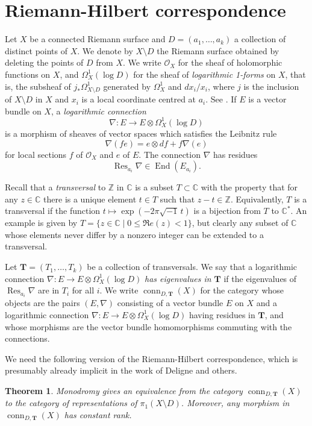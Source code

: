 \documentclass{amsart}
\theoremstyle{plain}
\newtheorem{thm}{Theorem}[section]
\theoremstyle{definition}
\theoremstyle{remark}
\newcommand{\C}{\mathbb{C}}
\newcommand{\Z}{\mathbb{Z}}
\DeclareMathOperator{\End}{End}
\DeclareMathOperator{\Res}{Res}
\DeclareMathOperator{\conn}{conn}
\newcommand{\OO}{\mathcal{O}}
\begin{document}
\section{Riemann-Hilbert correspondence}\label{s:RH}
Let $X$ be a connected Riemann surface and $D=(a_1,\dots,a_k)$ a collection
of distinct points of $X$. We denote by $X\setminus D$ the Riemann surface
obtained by deleting the points of $D$ from $X$.
We write $\OO_X$ for the sheaf of holomorphic functions on $X$, and $\Omega^1_X(\log D)$
for the sheaf of \emph{logarithmic 1-forms} on $X$, that is,
the subsheaf of $j_*\Omega_{X\setminus D}^1$ generated by $\Omega_X^1$ and $dx_i/x_i$,
where $j$ is the inclusion of $X\setminus D$ in $X$ and
$x_i$ is a local coordinate centred at $a_i$.
See \cite[\S II.3]{Deligne}.
If $E$ is a vector bundle on $X$,
a \emph{logarithmic connection}
\[
\nabla:E\to E\otimes \Omega^1_X(\log D)
\]
is a morphism of sheaves of vector spaces which satisfies the Leibnitz rule
\[
\nabla(fe) = e\otimes df + f\nabla(e)
\]
for local sections $f$ of $\OO_X$ and $e$ of $E$. The connection $\nabla$ has residues
\[
\Res_{a_i} \nabla \in \End(E_{a_i}).
\]


Recall that a \emph{transversal} to $\Z$ in $\C$ is a subset $T\subset \C$ with the property
that for any $z\in\C$ there is a unique element $t\in T$ such that $z-t\in\Z$.
Equivalently, $T$ is a transversal if the
function $t\mapsto\exp(-2\pi\sqrt{-1} \, t)$ is a bijection from $T$ to $\C^*$.
An example is given by $T = \{ z\in \C \mid 0 \le \Re e(z) < 1 \}$, but clearly any subset
of $\C$ whose elements never differ by a nonzero integer can be extended to a transversal.

Let $\mathbf{T} = (T_1,\dots,T_k)$ be a collection of transversals.
We say that a logarithmic connection $\nabla:E\to E\otimes \Omega_X^1(\log D)$
\emph{has eigenvalues in $\mathbf{T}$}
if the eigenvalues of $\Res_{a_i}\nabla$ are in $T_i$ for all $i$.
We write $\conn_{D,\mathbf{T}}(X)$ for the category whose objects are the pairs
$(E,\nabla)$ consisting of a vector bundle $E$
on $X$ and a logarithmic connection $\nabla:E\to E\otimes \Omega_X^1(\log D)$ having
residues in $\mathbf{T}$,
and whose morphisms are the vector bundle homomorphisms commuting with the connections.

We need the following version of the Riemann-Hilbert correspondence,
which is presumably already implicit in the work of Deligne \cite{Deligne}
and others.


\begin{thm}\label{t:rh}
Monodromy gives an equivalence from the category $\conn_{D,\mathbf{T}}(X)$
to the category of representations of $\pi_1(X\setminus D)$. Moreover, any
morphism in $\conn_{D,\mathbf{T}}(X)$ has constant rank.
\end{thm}
\end{document}
